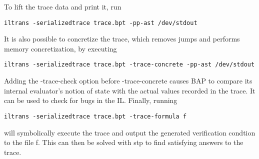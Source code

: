 To lift the trace data and print it, run 

\begin{verbatim}
iltrans -serializedtrace trace.bpt -pp-ast /dev/stdout
\end{verbatim}

It is also possible to concretize the trace, which removes jumps and performs
memory concretization, by executing 

\begin{verbatim}
iltrans -serializedtrace trace.bpt -trace-concrete -pp-ast /dev/stdout
\end{verbatim}

Adding the -trace-check option before -trace-concrete causes BAP to compare its
internal evaluator's notion of state with the actual values recorded in the
trace.  It can be used to check for bugs in the IL.  Finally, running 

\begin{verbatim}
iltrans -serializedtrace trace.bpt -trace-formula f
\end{verbatim}

will symbolically execute the trace and output the generated verification
condtion to the file f. This can then be solved with stp to find satisfying
answers to the trace.
